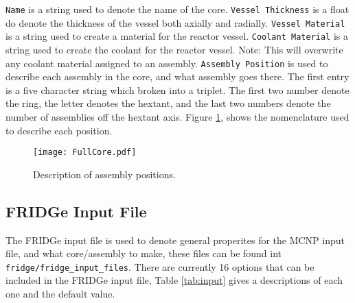 \documentclass{article}
\begin{document}
\verb|Name| is a string used to denote the name of the core. \verb|Vessel Thickness| is a float do denote the thickness of the vessel both axially and radially. \verb|Vessel Material| is a string used to create a material for the reactor vessel. \verb|Coolant Material| is a string used to create the coolant for the reactor vessel. Note: This will overwrite any coolant material assigned to an assembly. \verb|Assembly Position| is used to describe each assembly in the core, and what assembly goes there. The first entry is a five character string which broken into a triplet. The first two number denote the ring, the letter denotes the hextant, and the last two numbers denote the number of assemblies off the hextant axis. Figure \ref{fig: Core}, shows the nomenclature used to describe each position.

\begin{figure}
    \centering
    \texttt{[image: FullCore.pdf]}
    \caption{Description of assembly positions.}
    \label{fig: Core}
\end{figure}

\subsection{FRIDGe Input File}

The FRIDGe input file is used to denote general properites for the MCNP input file, and what core/assembly to make, these files can be found int \verb|fridge/fridge_input_files|. There are currently 16 options that can be included in the FRIDGe input file, Table \ref{tab:input} gives a descriptions of each one and the default value.
\end{document}
